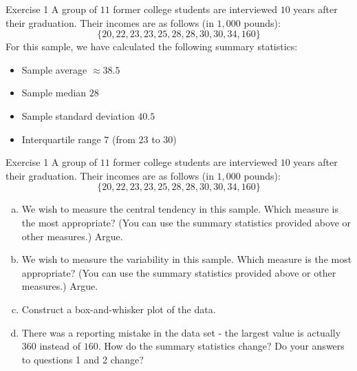 \documentclass[
  11pt,
  ignorenonframetext,
]{beamer}
\begin{document}
\begin{frame}{Exercise 1}
\protect\hypertarget{exercise-1}{}
A group of \(11\) former college students are interviewed \(10\) years
after their graduation. Their incomes are as follows (in \(1,000\)
pounds): \[
\{20, 22, 23, 23, 25, 28, 28, 30, 30, 34, 160\}
\] For this sample, we have calculated the following summary statistics:

\begin{itemize}
\item
  Sample average \(\approx 38.5\)
\item
  Sample median \(28\)
\item
  Sample standard deviation \(40.5\)
\item
  Interquartile range \(7\) (from \(23\) to \(30\))
\end{itemize}
\end{frame}

\begin{frame}{Exercise 1}
\protect\hypertarget{exercise-1-1}{}
A group of \(11\) former college students are interviewed \(10\) years
after their graduation. Their incomes are as follows (in \(1,000\)
pounds): \[
\{20, 22, 23, 23, 25, 28, 28, 30, 30, 34, 160\}
\]

\begin{enumerate}
[a.]
\item
  We wish to measure the central tendency in this sample. Which measure
  is the most appropriate? (You can use the summary statistics provided
  above or other measures.) Argue.
\item
  We wish to measure the variability in this sample. Which measure is
  the most appropriate? (You can use the summary statistics provided
  above or other measures.) Argue.
\item
  Construct a box-and-whisker plot of the data.
\item
  There was a reporting mistake in the data set - the largest value is
  actually \(360\) instead of \(160\). How do the summary statistics
  change? Do your answers to questions 1 and 2 change?
\end{enumerate}
\end{frame}
\end{document}
